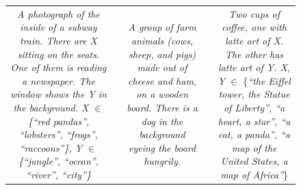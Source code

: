 \begin{figure}[ht!]
\begin{adjustwidth}{-0.8in}{-0.5in}
\begin{tabular}{cccccccccccccccccccc}
\multicolumn{6}{p{\thirdcolwidth\textwidth}}{\textit{\tiny A photograph of the inside of a subway train. There are \textit{X} sitting on the seats. One of them is reading a newspaper. The window shows the \textit{Y} in the background. \textit{X} $\in$ \{\textit{``red pandas'', ``lobsters'', ``frogs'', ``raccoons''}\}, \textit{Y} $\in$ \{\textit{``jungle'', ``ocean'', ``river'', ``city''}\}}} && 
\multicolumn{6}{p{\thirdcolwidth\textwidth}}{\textit{\tiny A group of farm animals (cows, sheep, and pigs) made out of cheese and ham, on a wooden board. There is a dog in the background eyeing the board hungrily.}} && 
\multicolumn{6}{p{\thirdcolwidth\textwidth}}{{\tiny \textit{Two cups of coffee, one with latte art of \textit{X}. The other has latte art of \textit{Y}. \textit{X, Y}} $\in$ \{\textit{``the Eiffel tower, the Statue of Liberty'', ``a heart, a star'', ``a cat, a panda'', ``a map of the United States, a map of Africa''}\}}} \\


\end{tabular}
\end{adjustwidth}
\end{figure}
